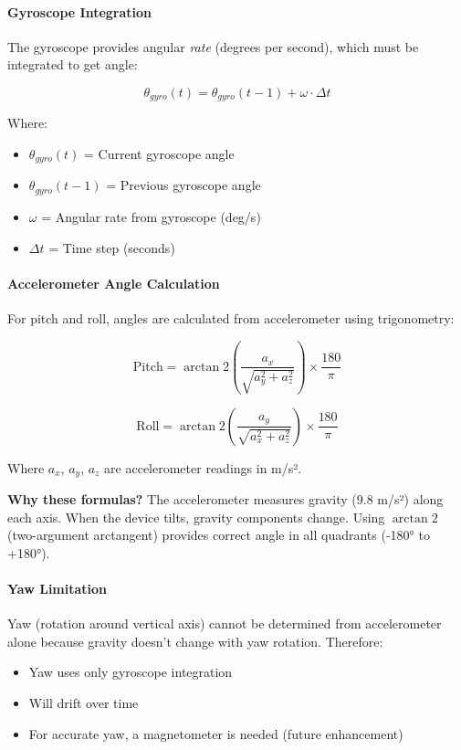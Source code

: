 \documentclass[11pt,a4paper]{article}
\begin{document}
\paragraph{Gyroscope Integration}
The gyroscope provides angular \textit{rate} (degrees per second), which must be integrated to get angle:

\begin{equation}
\theta_{gyro}(t) = \theta_{gyro}(t-1) + \omega \cdot \Delta t
\end{equation}

Where:
\begin{itemize}
    \item $\theta_{gyro}(t)$ = Current gyroscope angle
    \item $\theta_{gyro}(t-1)$ = Previous gyroscope angle
    \item $\omega$ = Angular rate from gyroscope (deg/s)
    \item $\Delta t$ = Time step (seconds)
\end{itemize}

\paragraph{Accelerometer Angle Calculation}
For pitch and roll, angles are calculated from accelerometer using trigonometry:

\begin{equation}
\text{Pitch} = \arctan2\left(\frac{a_x}{\sqrt{a_y^2 + a_z^2}}\right) \times \frac{180}{\pi}
\end{equation}

\begin{equation}
\text{Roll} = \arctan2\left(\frac{a_y}{\sqrt{a_x^2 + a_z^2}}\right) \times \frac{180}{\pi}
\end{equation}

Where $a_x$, $a_y$, $a_z$ are accelerometer readings in m/s².

\textbf{Why these formulas?} The accelerometer measures gravity (9.8 m/s²) along each axis. When the device tilts, gravity components change. Using $\arctan2$ (two-argument arctangent) provides correct angle in all quadrants (-180° to +180°).

\paragraph{Yaw Limitation}
Yaw (rotation around vertical axis) cannot be determined from accelerometer alone because gravity doesn't change with yaw rotation. Therefore:
\begin{itemize}
    \item Yaw uses only gyroscope integration
    \item Will drift over time
    \item For accurate yaw, a magnetometer is needed (future enhancement)
\end{itemize}
\end{document}
